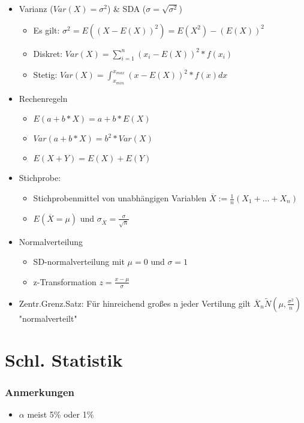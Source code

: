 \documentclass[a4paper]{article}
\begin{document}
\begin{landscape}
\begin{multicols}{4}
\begin{itemize}[noitemsep,nolistsep,leftmargin=*]
        \item Varianz ($Var(X) = \sigma^2$) \& SDA ($\sigma = \sqrt{\sigma^2}$)
        \begin{itemize}[noitemsep,nolistsep,leftmargin=*]
            \item Es gilt: $\sigma^2 = E((X-E(X))^2) = E(X^2)- (E(X))^2$
            \item Diskret: $Var(X) = \sum^n_{i=1} (x_i-E(X))^2 * f(x_i)$
            \item Stetig: $Var(X) = \int^{x_{max}}_{x_{min}} (x-E(X))^2 * f(x) dx$
        \end{itemize}
        \item Rechenregeln
        \begin{itemize}[noitemsep,nolistsep,leftmargin=*]
            \item $E(a+b*X) = a + b* E(X)$
            \item $Var(a+b*X) = b^2 * Var(X)$
            \item $E(X+Y) = E(X) + E(Y)$
        \end{itemize}
        \item Stichprobe:
        \begin{itemize}[noitemsep,nolistsep,leftmargin=*]
            \item Stichprobenmittel von unabhängigen Variablen $\overline{X} := \frac{1}{n} (X_1 + \dots + X_n)$
            \item $E(\overline{X} = \mu)$ und $\sigma_{\overline{X}} = \frac{\sigma}{\sqrt{n}}$
        \end{itemize}
        \item Normalverteilung
        \begin{itemize}[noitemsep,nolistsep,leftmargin=*]
            \item SD-normalverteilung mit $\mu = 0$ und $\sigma = 1$
            \item z-Transformation $z = \frac{x-\mu}{\sigma}$
        \end{itemize}
        \item Zentr.Grenz.Satz: Für hinreichend großes n jeder Vertilung gilt $\overline{X}_n \tilde N(\mu, \frac{\sigma^2}{n}) $ "normalverteilt"
    \end{itemize}


    \section{Schl. Statistik}
        \subsubsection*{Anmerkungen}
        \begin{itemize}[noitemsep,nolistsep,leftmargin=*]
            \item $\alpha$ meist 5\% oder 1\%
        \end{itemize}

\end{multicols}
\end{landscape}
\end{document}
